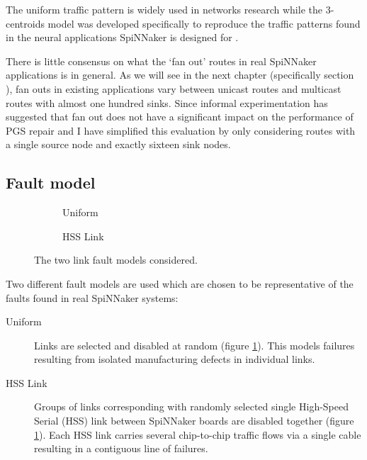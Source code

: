 			The uniform traffic pattern is widely used in networks research
			\cite{dally04,davies12} while the 3-centroids model was developed
			specifically to reproduce the traffic patterns found in the neural
			applications SpiNNaker is designed for \cite{navaridas14}.
			
			There is little consensus on what the `fan out' routes in real SpiNNaker
			applications is in general. As we will see in the next chapter
			(specifically section \label{sec:existing-applications}), fan outs in
			existing applications vary between unicast routes and multicast routes
			with almost one hundred sinks. Since informal experimentation has
			suggested that fan out does not have a significant impact on the
			performance of PGS repair and I have simplified this evaluation by only
			considering routes with a single source node and exactly sixteen sink
			nodes.
		
		\subsection{Fault model}
			
			\begin{figure}
				\center
				\begin{subfigure}{0.48\linewidth}
					\hspace*{-1.5cm}
					
					\caption{Uniform}
					\label{fig:fault-example-uniform}
				\end{subfigure}
				\begin{subfigure}{0.48\linewidth}
					\hspace*{-1.5cm}
					
					\caption{HSS Link}
					\label{fig:fault-example-hss}
				\end{subfigure}
				
				\caption{The two link fault models considered.}
				\label{fig:fault-example}
			\end{figure}
			
			Two different fault models are used which are chosen to be representative
			of the faults found in real SpiNNaker systems:
			
			\begin{description}
				
				\item[Uniform] Links are selected and disabled at random (figure
				\ref{fig:fault-example-uniform}). This models failures resulting from
				isolated manufacturing defects in individual links.
				
				\item[HSS Link] Groups of links corresponding with randomly selected
				single High-Speed Serial (HSS) link between SpiNNaker boards are
				disabled together (figure \ref{fig:fault-example-uniform}). Each HSS
				link carries several chip-to-chip traffic flows via a single cable
				resulting in a contiguous line of failures.
				
			\end{description}
			
